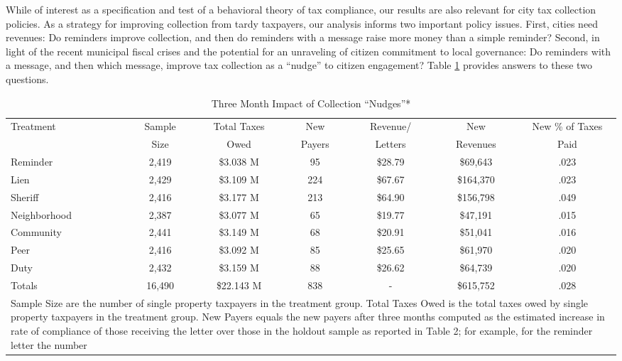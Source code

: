 While of interest as a specification and test of a behavioral theory
of tax compliance, our results are also relevant for city tax
collection policies.  As a strategy for improving collection from
tardy taxpayers, our analysis informs two important policy issues.
First, cities need revenues: Do reminders improve collection, and then
do reminders with a message raise more money than a simple reminder?
Second, in light of the recent municipal fiscal crises and the
potential for an unraveling of citizen commitment to local governance:
Do reminders with a message, and then which message, improve tax
collection as a ``nudge'' to citizen engagement? Table \ref{sh_rev}
provides answers to these two questions.


\begin{table}[htb]
\caption{Three Month Impact of Collection ``Nudges''*} 
\label{sh_rev}
\centering
\begin{adjustbox}{width=\textwidth,totalheight=.9\textheight,keepaspectratio}
\begin{tabular}{lcccccc}
  \hline
Treatment & Sample & Total Taxes & New  & Revenue/ & New  & New \% of Taxes 
\\ 
& Size & Owed & Payers & Letters & Revenues & Paid\\
\hline
Reminder & 2,419 & \$3.038 M & 95 & \$28.79 & \$69,643 & .023\\ 
  Lien & 2,429 & \$3.109 M & 224 & \$67.67 & \$164,370 & .023 \\ 
  Sheriff & 2,416 & \$3.177 M & 213 & \$64.90 & \$156,798 & .049 \\ 
Neighborhood & 2,387 & \$3.077 M & 65 & \$19.77 & \$47,191 & .015 \\ 
  Community & 2,441 & \$3.149 M & 68 & \$20.91 & \$51,041 & .016\\ 
  Peer & 2,416 & \$3.092 M & 85 & \$25.65 & \$61,970 & .020\\ 
  Duty & 2,432 & \$3.159 M & 88 & \$26.62 & \$64,739 & .020\\ 
   \hline
   \hline
  Totals & 16,490 & \$22.143 M & 838 & - & \$615,752 & .028\\
  \hline
\multicolumn{7}{p{1\textwidth}}{\scriptsize* Sample Size are the
  number of single property taxpayers in the treatment group.  Total
  Taxes Owed is the total taxes owed by single property taxpayers in
  the treatment group. New Payers equals the new payers after three
  months computed as the estimated increase in rate of compliance of
  those receiving the letter over those in the holdout sample as
  reported in Table 2; for example, for the reminder letter the number
}
\end{tabular}
\end{adjustbox}
\end{table}
